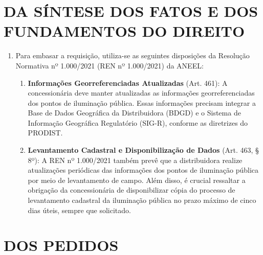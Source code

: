  


\newcommand{\Peticao}{PETIÇÃO DE DOCUMENTOS E INFORMAÇÕES}
\newcommand{\NumeroDoc}{009}








\section{DA SÍNTESE DOS FATOS E DOS FUNDAMENTOS DO DIREITO}
\begin{enumerate} [resume]
  \item Para embasar a requisição, utiliza-se as seguintes disposições da Resolução Normativa nº 1.000/2021 (REN nº 1.000/2021) da ANEEL:
    \begin{enumerate}
      \item \textbf{Informações Georreferenciadas Atualizadas} (Art. 461): A concessionária deve manter atualizadas as informações georreferenciadas dos pontos de iluminação pública. Essas informações precisam integrar a Base de Dados Geográfica da Distribuidora (BDGD) e o Sistema de Informação Geográfica Regulatório (SIG-R), conforme as diretrizes do PRODIST.
      \item \textbf{Levantamento Cadastral e Disponibilização de Dados} (Art. 463, § 8º): A REN nº 1.000/2021 também prevê que a distribuidora realize atualizações periódicas das informações dos pontos de iluminação pública por meio de levantamento de campo. Além disso, é crucial ressaltar a obrigação da concessionária de disponibilizar cópia do processo de levantamento cadastral da iluminação pública no prazo máximo de cinco dias úteis, sempre que solicitado.
    \end{enumerate}
\end{enumerate}

\section{DOS PEDIDOS}

